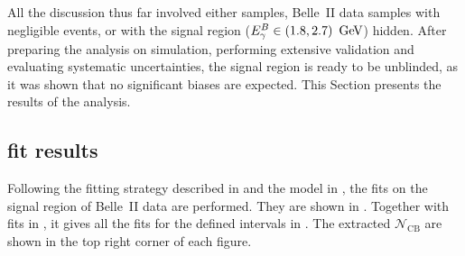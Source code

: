 All the discussion thus far involved either \MC samples, Belle~II data samples with negligible \BtoXsgamma events,
or with the signal region (${E^B_{\gamma}}\in(1.8,2.7)~\mathrm{\,Ge\kern -0.1em V}$) hidden.
After preparing the analysis on simulation, performing extensive validation and evaluating systematic uncertainties, 
the signal region is ready to be unblinded, as it was shown that no significant biases are expected.
This Section presents the results of the analysis.

\subsection{\texorpdfstring{\Mbc}{Mbc} fit results}\label{sec:mbc_fit_results}

Following the \Mbc fitting strategy described in  and the model in ,
the fits on the signal region of Belle~II data are performed.
They are shown in .
Together with fits in , it gives all the fits for the defined \EB intervals in .
The extracted $\mathcal{N}_{\mathrm{CB}}$ are shown in the top right corner of each figure.
